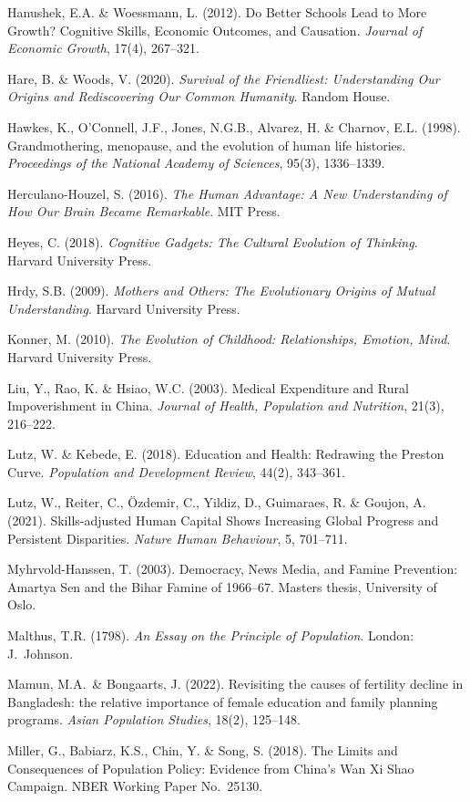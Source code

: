 \documentclass[12pt,letterpaper]{article}
\begin{document}
Hanushek, E.A. \& Woessmann, L. (2012). Do Better Schools Lead to More
Growth? Cognitive Skills, Economic Outcomes, and Causation.
\emph{Journal of Economic Growth}, 17(4), 267--321.

Hare, B. \& Woods, V. (2020). \emph{Survival of the Friendliest:
Understanding Our Origins and Rediscovering Our Common Humanity}.
Random House.

Hawkes, K., O'Connell, J.F., Jones, N.G.B., Alvarez, H. \& Charnov, E.L.
(1998). Grandmothering, menopause, and the evolution of human life
histories. \emph{Proceedings of the National Academy of Sciences},
95(3), 1336--1339.

Herculano-Houzel, S. (2016). \emph{The Human Advantage: A New
Understanding of How Our Brain Became Remarkable}. MIT Press.

Heyes, C. (2018). \emph{Cognitive Gadgets: The Cultural Evolution of
Thinking}. Harvard University Press.

Hrdy, S.B. (2009). \emph{Mothers and Others: The Evolutionary Origins
of Mutual Understanding}. Harvard University Press.

Konner, M. (2010). \emph{The Evolution of Childhood: Relationships,
Emotion, Mind}. Harvard University Press.

Liu, Y., Rao, K. \& Hsiao, W.C. (2003). Medical Expenditure and Rural
Impoverishment in China. \emph{Journal of Health, Population and
Nutrition}, 21(3), 216--222.

Lutz, W. \& Kebede, E. (2018). Education and Health: Redrawing the
Preston Curve. \emph{Population and Development Review}, 44(2),
343--361.

Lutz, W., Reiter, C., Özdemir, C., Yildiz, D., Guimaraes, R. \& Goujon,
A. (2021). Skills-adjusted Human Capital Shows Increasing Global
Progress and Persistent Disparities. \emph{Nature Human Behaviour}, 5,
701--711.

Myhrvold-Hanssen, T. (2003). Democracy, News Media, and Famine
Prevention: Amartya Sen and the Bihar Famine of 1966--67. Masters thesis,
University of Oslo.

Malthus, T.R. (1798). \emph{An Essay on the Principle of Population}.
London: J.~Johnson.

Mamun, M.A.~\& Bongaarts, J. (2022). Revisiting the causes of fertility
decline in Bangladesh: the relative importance of female education and
family planning programs. \emph{Asian Population Studies}, 18(2),
125--148.

Miller, G., Babiarz, K.S., Chin, Y. \& Song, S. (2018). The Limits and
Consequences of Population Policy: Evidence from China's Wan Xi Shao
Campaign. NBER Working Paper No.~25130.
\end{document}
